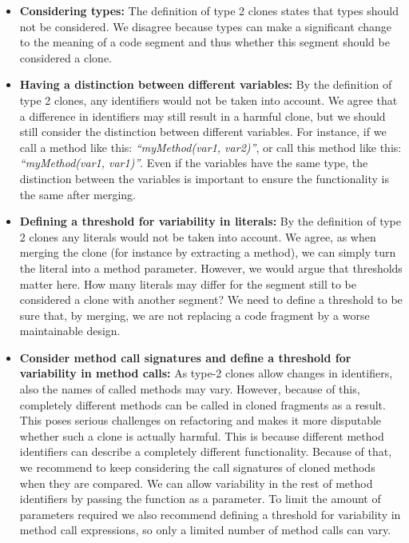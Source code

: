 \documentclass[a4paper]{article}
\begin{document}
\begin{itemize}
  \item \textbf{Considering types:} The definition of type 2 clones states that types should not be considered. We disagree because types can make a significant change to the meaning of a code segment and thus whether this segment should be considered a clone.
  \item \textbf{Having a distinction between different variables:} By the definition of type 2 clones, any identifiers would not be taken into account. We agree that a difference in identifiers may still result in a harmful clone, but we should still consider the distinction between different variables. For instance, if we call a method like this: \textit{``myMethod(var1, var2)''}, or call this method like this: \textit{``myMethod(var1, var1)''}. Even if the variables have the same type, the distinction between the variables is important to ensure the functionality is the same after merging.
  \item \textbf{Defining a threshold for variability in literals:} By the definition of type 2 clones any literals would not be taken into account. We agree, as when merging the clone (for instance by extracting a method), we can simply turn the literal into a method parameter. However, we would argue that thresholds matter here. How many literals may differ for the segment still to be considered a clone with another segment? We need to define a threshold to be sure that, by merging, we are not replacing a code fragment by a worse maintainable design.
  \item \textbf{Consider method call signatures and define a threshold for variability in method calls:} As type-2 clones allow changes in identifiers, also the names of called methods may vary. However, because of this, completely different methods can be called in cloned fragments as a result. This poses serious challenges on refactoring and makes it more disputable whether such a clone is actually harmful. This is because different method identifiers can describe a completely different functionality. Because of that, we recommend to keep considering the call signatures of cloned methods when they are compared. We can allow variability in the rest of method identifiers by passing the function as a parameter. To limit the amount of parameters required we also recommend defining a threshold for variability in method call expressions, so only a limited number of method calls can vary.
\end{itemize}
\end{document}
